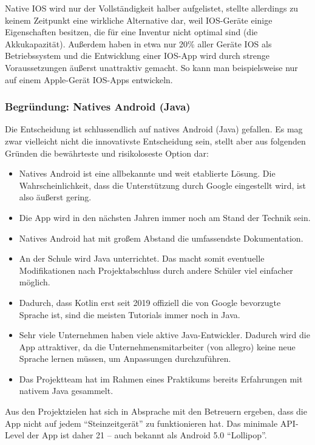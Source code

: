 Native IOS wird nur der Vollständigkeit halber aufgelistet, stellte
allerdings zu keinem Zeitpunkt eine wirkliche Alternative dar, weil
IOS-Geräte einige Eigenschaften besitzen, die für eine Inventur nicht
optimal sind (\zB die Akkukapazität). Außerdem haben in etwa nur 20\%
aller Geräte \cite{ios-market-share} IOS als Betriebssystem und die
Entwicklung einer IOS-App wird durch strenge Voraussetzungen äußerst
unattraktiv gemacht. So kann man beispielsweise nur auf einem
Apple-Gerät IOS-Apps entwickeln.

\hypertarget{begruxfcndung-natives-android-java}{%
\subsubsection{Begründung: Natives Android
(Java)}\label{begruxfcndung-natives-android-java}}

Die Entscheidung ist schlussendlich auf natives Android (Java) gefallen.
Es mag zwar vielleicht nicht die innovativste Entscheidung sein, stellt
aber aus folgenden Gründen die bewährteste und risikoloseste Option dar:

\begin{itemize}
\tightlist
\item
  Natives Android ist eine allbekannte und weit etablierte Lösung. Die
  Wahrscheinlichkeit, dass die Unterstützung durch Google eingestellt
  wird, ist also äußerst gering.
\item
  Die App wird in den nächsten Jahren immer noch am Stand der Technik
  sein.
\item
  Natives Android hat mit großem Abstand die umfassendste Dokumentation.
\item
  An der Schule wird Java unterrichtet. Das macht somit eventuelle
  Modifikationen nach Projektabschluss durch andere Schüler viel
  einfacher möglich.
\item
  Dadurch, dass Kotlin erst seit 2019 \cite{kotlin-preference} offiziell
  die von Google bevorzugte Sprache ist, sind die meisten Tutorials
  immer noch in Java.
\item
  Sehr viele Unternehmen haben viele aktive Java-Entwickler. Dadurch
  wird die App attraktiver, da die Unternehmensmitarbeiter (von
  \zB allegro) keine neue Sprache lernen müssen, um Anpassungen
  durchzuführen.
\item
  Das Projektteam hat im Rahmen eines Praktikums bereits Erfahrungen mit
  nativem Java gesammelt.
\end{itemize}

Aus den Projektzielen hat sich in Absprache mit den Betreuern ergeben,
dass die App nicht auf jedem ``Steinzeitgerät'' zu funktionieren hat.
Das minimale API-Level der App ist daher 21 -- auch bekannt als Android
5.0 ``Lollipop''.

